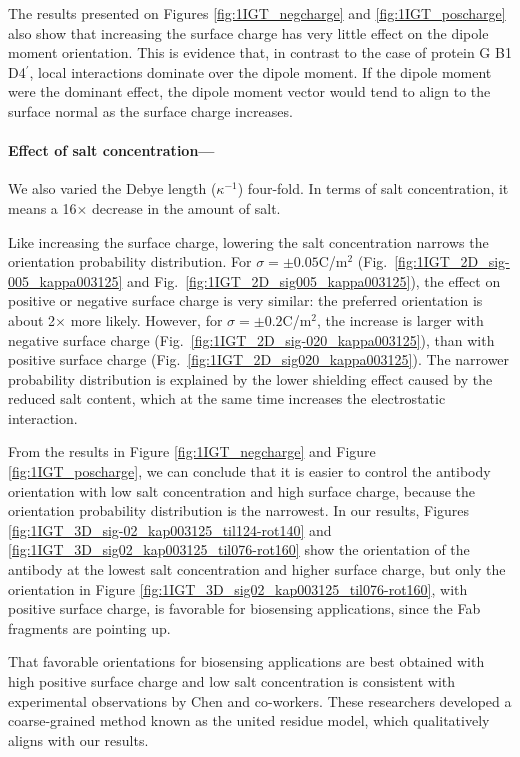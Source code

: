 The results presented on Figures \ref{fig:1IGT_negcharge} and \ref{fig:1IGT_poscharge} also show that increasing the surface charge has very little effect on the dipole moment orientation. This is evidence that, in contrast to the case of protein G B1 D4$^\prime$, local interactions dominate over the dipole moment. If the dipole moment were the dominant effect, the dipole moment vector would tend to align to the surface normal as the surface charge increases.
 
 \medskip
 
 \paragraph*{Effect of salt concentration---}
 
 We also varied the Debye length ($\kappa^{-1}$) four-fold. In terms of salt concentration, it means a 16$\times$ decrease in the amount of salt. 
 
 Like increasing the surface charge, lowering the salt concentration narrows the orientation probability distribution. For $\sigma=\pm0.05$C/m$^2$ (Fig.~\ref{fig:1IGT_2D_sig-005_kappa003125} and Fig.~\ref{fig:1IGT_2D_sig005_kappa003125}), the effect on positive or negative surface charge is very similar: the preferred orientation is about 2$\times$ more likely. However, for $\sigma=\pm0.2$C/m$^2$, the increase is larger with negative surface charge (Fig.~\ref{fig:1IGT_2D_sig-020_kappa003125}), than with positive surface charge (Fig.~\ref{fig:1IGT_2D_sig020_kappa003125}). The narrower probability distribution is explained by the lower shielding effect caused by the reduced salt content, which at the same time increases the electrostatic interaction.

From the results in Figure \ref{fig:1IGT_negcharge} and Figure \ref{fig:1IGT_poscharge}, we can conclude that it is easier to control the antibody orientation with low salt concentration and high surface charge, because the orientation probability distribution is the narrowest. In our results, Figures \ref{fig:1IGT_3D_sig-02_kap003125_til124-rot140} and \ref{fig:1IGT_3D_sig02_kap003125_til076-rot160} show the orientation of the antibody at the lowest salt concentration and higher surface charge, but only the orientation in Figure \ref{fig:1IGT_3D_sig02_kap003125_til076-rot160}, with positive surface charge, is favorable for biosensing applications, since the Fab fragments are pointing up.

That favorable orientations for biosensing applications are best obtained with high positive surface charge and low salt concentration is consistent with experimental observations by Chen and co-workers. \cite{ChenLiuZhouJiang2003} These researchers developed a coarse-grained method known as the united residue model,\cite{ZhouChenJiang2003} which qualitatively aligns with our results.
 
